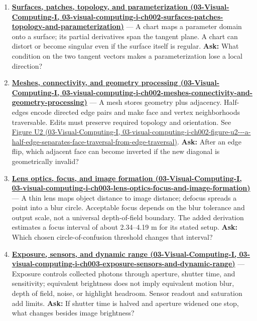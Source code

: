 \begin{enumerate}
\item
  \textbf{\href{../03-Visual-Computing-I/main.pdf\#nameddest=03-visual-computing-i-ch002-surfaces-patches-topology-and-parameterization}{Surfaces, patches, topology, and parameterization (03-Visual-Computing-I, 03-visual-computing-i-ch002-surfaces-patches-topology-and-parameterization)}} --- A chart maps a parameter domain onto a surface; its partial derivatives span the tangent plane. A chart can distort or become singular even if the surface itself is regular. \textbf{Ask:} What condition on the two tangent vectors makes a parameterization lose a local direction?
\item
  \textbf{\href{../03-Visual-Computing-I/main.pdf\#nameddest=03-visual-computing-i-ch002-meshes-connectivity-and-geometry-processing}{Meshes, connectivity, and geometry processing (03-Visual-Computing-I, 03-visual-computing-i-ch002-meshes-connectivity-and-geometry-processing)}} --- A mesh stores geometry plus adjacency. Half-edges encode directed edge pairs and make face and vertex neighborhoods traversable. Edits must preserve required topology and orientation. See \href{../03-Visual-Computing-I/main.pdf\#nameddest=03-visual-computing-i-ch002-figure-u2---a-half-edge-separates-face-traversal-from-edge-traversal}{Figure U2 (03-Visual-Computing-I, 03-visual-computing-i-ch002-figure-u2-\/-\/-a-half-edge-separates-face-traversal-from-edge-traversal)}. \textbf{Ask:} After an edge flip, which adjacent face can become inverted if the new diagonal is geometrically invalid?
\item
  \textbf{\href{../03-Visual-Computing-I/main.pdf\#nameddest=03-visual-computing-i-ch003-lens-optics-focus-and-image-formation}{Lens optics, focus, and image formation (03-Visual-Computing-I, 03-visual-computing-i-ch003-lens-optics-focus-and-image-formation)}} --- A thin lens maps object distance to image distance; defocus spreads a point into a blur circle. Acceptable focus depends on the blur tolerance and output scale, not a universal depth-of-field boundary. The added derivation estimates a focus interval of about 2.34--4.19 m for its stated setup. \textbf{Ask:} Which chosen circle-of-confusion threshold changes that interval?
\item
  \textbf{\href{../03-Visual-Computing-I/main.pdf\#nameddest=03-visual-computing-i-ch003-exposure-sensors-and-dynamic-range}{Exposure, sensors, and dynamic range (03-Visual-Computing-I, 03-visual-computing-i-ch003-exposure-sensors-and-dynamic-range)}} --- Exposure controls collected photons through aperture, shutter time, and sensitivity; equivalent brightness does not imply equivalent motion blur, depth of field, noise, or highlight headroom. Sensor readout and saturation add limits. \textbf{Ask:} If shutter time is halved and aperture widened one stop, what changes besides image brightness?

\end{enumerate}
